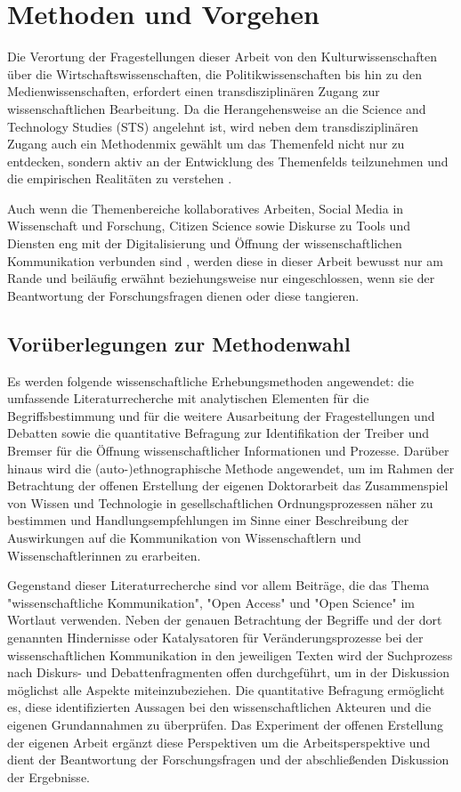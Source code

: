 \chapter{Methoden und Vorgehen}

Die Verortung der Fragestellungen dieser Arbeit von den Kulturwissenschaften über die Wirtschaftswissenschaften, die Politikwissenschaften bis hin zu den Medienwissenschaften, erfordert einen transdisziplinären Zugang zur wissenschaftlichen Bearbeitung. Da die Herangehensweise an die Science and Technology Studies (STS) angelehnt ist, wird neben dem transdisziplinären Zugang auch ein Methodenmix gewählt um das Themenfeld nicht nur zu entdecken, sondern aktiv an der Entwicklung des Themenfelds teilzunehmen \cite{MacKenzie_STS_1999} und die empirischen Realitäten zu verstehen \cite{kelty_2014_freedom}.

Auch wenn die Themenbereiche kollaboratives Arbeiten, Social Media in Wissenschaft und Forschung, Citizen Science sowie Diskurse zu Tools und Diensten eng mit der Digitalisierung und Öffnung der wissenschaftlichen Kommunikation verbunden sind \cite{eu_agenda_open_science_2015}, werden diese in dieser Arbeit bewusst nur am Rande und beiläufig erwähnt beziehungsweise nur eingeschlossen, wenn sie der Beantwortung der Forschungsfragen dienen oder diese tangieren.

\section{Vorüberlegungen zur Methodenwahl}

Es werden folgende wissenschaftliche Erhebungsmethoden angewendet: die umfassende Literaturrecherche mit analytischen Elementen für die Begriffsbestimmung und für die weitere Ausarbeitung der Fragestellungen und Debatten sowie die quantitative Befragung zur Identifikation der Treiber und Bremser für die Öffnung wissenschaftlicher Informationen und Prozesse. Darüber hinaus wird die (auto-)ethnographische Methode angewendet, um im Rahmen der Betrachtung der offenen Erstellung der eigenen Doktorarbeit das Zusammenspiel von Wissen und Technologie in gesellschaftlichen Ordnungsprozessen näher zu bestimmen und Handlungsempfehlungen im Sinne einer Beschreibung der Auswirkungen auf die Kommunikation von Wissenschaftlern und Wissenschaftlerinnen zu erarbeiten.

Gegenstand dieser Literaturrecherche sind vor allem Beiträge, die das Thema "wissenschaftliche Kommunikation", "Open Access" und "Open Science" im Wortlaut verwenden. Neben der genauen Betrachtung der Begriffe und der dort genannten Hindernisse oder Katalysatoren für Veränderungsprozesse bei der wissenschaftlichen Kommunikation in den jeweiligen Texten wird der Suchprozess nach Diskurs- und Debattenfragmenten offen durchgeführt, um in der Diskussion möglichst alle Aspekte miteinzubeziehen. Die quantitative Befragung ermöglicht es, diese identifizierten Aussagen bei den wissenschaftlichen Akteuren und die eigenen Grundannahmen zu überprüfen. Das Experiment der offenen Erstellung der eigenen Arbeit ergänzt diese Perspektiven um die Arbeitsperspektive und dient der Beantwortung der Forschungsfragen und der abschließenden Diskussion der Ergebnisse.

